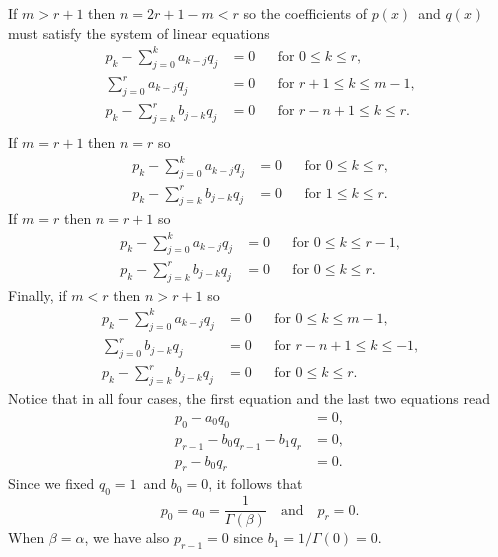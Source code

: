 \documentclass[12pt,a4paper]{article}
\begin{document}
If $m>r+1$ then $n=2r+1-m<r$ so the coefficients of $p(x)$~and $q(x)$ 
must satisfy the system of linear equations
\[
\begin{aligned}
p_k-\sum_{j=0}^ka_{k-j}q_j&=0&&\text{for $0\le k\le r$,}\\
\sum_{j=0}^r a_{k-j}q_j&=0&&\text{for $r+1\le k\le m-1$,}\\
p_k-\sum_{j=k}^rb_{j-k}q_j&=0&&\text{for $r-n+1\le k\le r$.}\\
\end{aligned}
\]
If $m=r+1$ then $n=r$ so
\[
\begin{aligned}
p_k-\sum_{j=0}^ka_{k-j}q_j&=0&&\text{for $0\le k\le r$,}\\
p_k-\sum_{j=k}^rb_{j-k}q_j&=0&&\text{for $1\le k\le r$.}
\end{aligned}
\]
If $m=r$ then $n=r+1$ so
\[
\begin{aligned}
p_k-\sum_{j=0}^ka_{k-j}q_j&=0&&\text{for $0\le k\le r-1$,}\\
p_k-\sum_{j=k}^rb_{j-k}q_j&=0&&\text{for $0\le k\le r$.}
\end{aligned}
\]
Finally, if $m<r$ then $n>r+1$ so
\[
\begin{aligned}
p_k-\sum_{j=0}^ka_{k-j}q_j&=0&&\text{for $0\le k\le m-1$,}\\
\sum_{j=0}^rb_{j-k}q_j&=0&&\text{for $r-n+1\le k\le-1$,}\\
p_k-\sum_{j=k}^rb_{j-k}q_j&=0&&\text{for $0\le k\le r$.}
\end{aligned}
\]
Notice that in all four cases, the first equation and the last two equations 
read
\begin{align*}
p_0-a_0q_0&=0,\\
p_{r-1}-b_0q_{r-1}-b_1q_r&=0,\\
p_r-b_0q_r&=0.
\end{align*}
Since we fixed $q_0=1$~and $b_0=0$, it follows that
\[
p_0=a_0=\frac{1}{\Gamma(\beta)}\quad\text{and}\quad p_r=0.
\]
When $\beta=\alpha$, we have also $p_{r-1}=0$ since $b_1=1/\Gamma(0)=0$.
\end{document}
